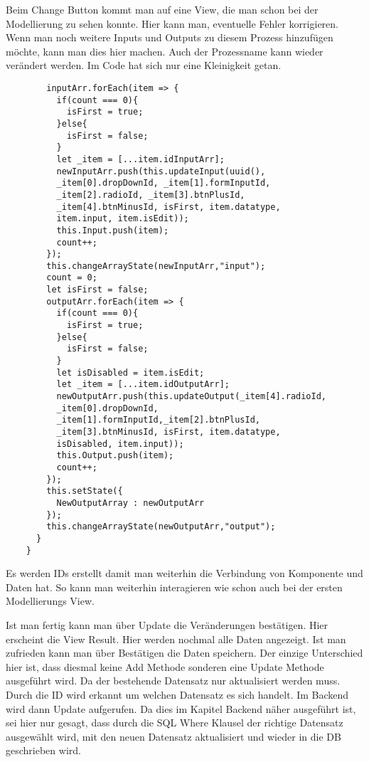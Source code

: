 \documentclass[a4paper,11pt]{scrreprt}
\begin{document}
Beim Change Button kommt man auf eine View, die man schon bei der Modellierung zu sehen konnte. Hier kann man, eventuelle Fehler korrigieren. Wenn man noch weitere Inputs und Outputs zu diesem Prozess hinzufügen möchte, kann man dies hier machen. Auch der Prozessname kann wieder verändert werden. 
Im Code hat sich nur eine Kleinigkeit getan. 
\begin{lstlisting}
        inputArr.forEach(item => {
          if(count === 0){
            isFirst = true;
          }else{
            isFirst = false;
          }
          let _item = [...item.idInputArr];
          newInputArr.push(this.updateInput(uuid(),
          _item[0].dropDownId, _item[1].formInputId,
          _item[2].radioId, _item[3].btnPlusId,
          _item[4].btnMinusId, isFirst, item.datatype,
          item.input, item.isEdit));
          this.Input.push(item);
          count++;
        });
        this.changeArrayState(newInputArr,"input");
        count = 0;
        let isFirst = false;
        outputArr.forEach(item => {
          if(count === 0){
            isFirst = true;
          }else{
            isFirst = false;
          }
          let isDisabled = item.isEdit;
          let _item = [...item.idOutputArr];
          newOutputArr.push(this.updateOutput(_item[4].radioId,
          _item[0].dropDownId,
          _item[1].formInputId,_item[2].btnPlusId,
          _item[3].btnMinusId, isFirst, item.datatype,
          isDisabled, item.input));
          this.Output.push(item);
          count++;
        });
        this.setState({
          NewOutputArray : newOutputArr
        });
        this.changeArrayState(newOutputArr,"output");
      }
    }
\end{lstlisting}
Es werden IDs erstellt damit man weiterhin die Verbindung von Komponente und Daten hat. So kann man weiterhin interagieren wie schon auch bei der ersten Modellierungs View. 

Ist man fertig kann man über Update die Veränderungen bestätigen. Hier erscheint die View Result. Hier werden nochmal alle Daten angezeigt. Ist man zufrieden kann man über Bestätigen die Daten speichern. Der einzige Unterschied hier ist, dass diesmal keine Add Methode sonderen eine Update Methode ausgeführt wird. Da der bestehende Datensatz nur aktualisiert werden muss. Durch die ID wird erkannt um welchen Datensatz es sich handelt. Im Backend wird dann Update aufgerufen. Da dies im Kapitel Backend näher ausgeführt ist, sei hier nur gesagt, dass durch die SQL Where Klausel der richtige Datensatz ausgewählt wird, mit den neuen Datensatz aktualisiert und wieder in die DB geschrieben wird. 
\end{document}
